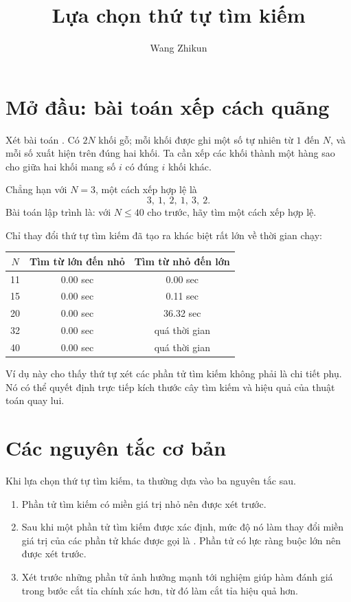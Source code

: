\documentclass[11pt]{article}
\title{Lựa chọn thứ tự tìm kiếm}
\author{Wang Zhikun}
\date{}
\begin{document}
\maketitle


\section{Mở đầu: bài toán xếp cách quãng}

Xét bài toán . Có \(2N\) khối gỗ; mỗi khối được ghi một
số tự nhiên từ \(1\) đến \(N\), và mỗi số xuất hiện trên đúng hai khối. Ta
cần xếp các khối thành một hàng sao cho giữa hai khối mang số \(i\) có đúng
\(i\) khối khác.

Chẳng hạn với \(N=3\), một cách xếp hợp lệ là
\[
  3,\ 1,\ 2,\ 1,\ 3,\ 2.
\]
Bài toán lập trình là: với \(N\le 40\) cho trước, hãy tìm một cách xếp hợp lệ.

Chỉ thay đổi thứ tự tìm kiếm đã tạo ra khác biệt rất lớn về thời gian chạy:

\begin{center}
\begin{tabular}{c|cc}
\hline
\(N\) & Tìm từ lớn đến nhỏ & Tìm từ nhỏ đến lớn \\
\hline
11 & 0.00 sec & 0.00 sec \\
15 & 0.00 sec & 0.11 sec \\
20 & 0.00 sec & 36.32 sec \\
32 & 0.00 sec & quá thời gian \\
40 & 0.00 sec & quá thời gian \\
\hline
\end{tabular}
\end{center}

Ví dụ này cho thấy thứ tự xét các phần tử tìm kiếm không phải là chi tiết phụ.
Nó có thể quyết định trực tiếp kích thước cây tìm kiếm và hiệu quả của thuật
toán quay lui.

\section{Các nguyên tắc cơ bản}

Khi lựa chọn thứ tự tìm kiếm, ta thường dựa vào ba nguyên tắc sau.

\begin{enumerate}
  \item Phần tử tìm kiếm có miền giá trị nhỏ nên được xét trước.
  \item Sau khi một phần tử tìm kiếm được xác định, mức độ nó làm thay đổi
  miền giá trị của các phần tử khác được gọi là . Phần tử
  có lực ràng buộc lớn nên được xét trước.
  \item Xét trước những phần tử ảnh hưởng mạnh tới nghiệm giúp hàm đánh giá
  trong bước cắt tỉa chính xác hơn, từ đó làm cắt tỉa hiệu quả hơn.
\end{enumerate}
\end{document}
